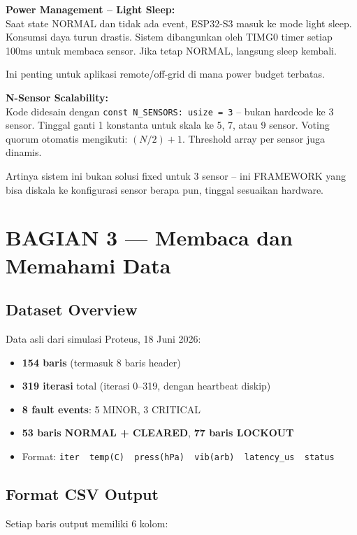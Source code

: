 \documentclass[12pt,a4paper]{article}
\begin{document}
\textbf{Power Management -- Light Sleep:}\\
Saat state NORMAL dan tidak ada event, ESP32-S3 masuk ke mode light sleep.
Konsumsi daya turun drastis. Sistem dibangunkan oleh TIMG0 timer setiap
100ms untuk membaca sensor. Jika tetap NORMAL, langsung sleep kembali.

Ini penting untuk aplikasi remote/off-grid di mana power budget terbatas.

\textbf{N-Sensor Scalability:}\\
Kode didesain dengan \texttt{const N\_SENSORS: usize = 3} -- bukan hardcode ke 3 sensor.
Tinggal ganti 1 konstanta untuk skala ke 5, 7, atau 9 sensor. Voting quorum
otomatis mengikuti: $(N/2)+1$. Threshold array per sensor juga dinamis.

Artinya sistem ini bukan solusi fixed untuk 3 sensor -- ini FRAMEWORK yang
bisa diskala ke konfigurasi sensor berapa pun, tinggal sesuaikan hardware.

\section{BAGIAN 3 --- Membaca dan Memahami Data}

\subsection{Dataset Overview}

Data asli dari simulasi Proteus, 18 Juni 2026:
\begin{itemize}[nosep]
    \item \textbf{154 baris} (termasuk 8 baris header)
    \item \textbf{319 iterasi} total (iterasi 0--319, dengan heartbeat diskip)
    \item \textbf{8 fault events}: 5 MINOR, 3 CRITICAL
    \item \textbf{53 baris NORMAL + CLEARED}, \textbf{77 baris LOCKOUT}
    \item Format: \texttt{iter\ \ temp(C)\ \ press(hPa)\ \ vib(arb)\ \ latency\_us\ \ status}
\end{itemize}

\subsection{Format CSV Output}

Setiap baris output memiliki 6 kolom:
\end{document}
